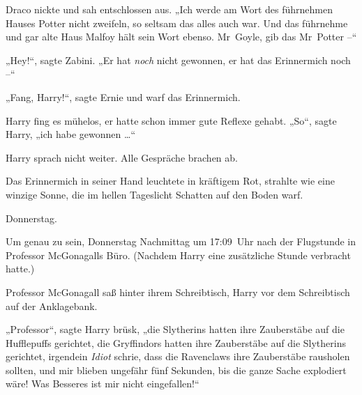 Draco nickte und sah entschlossen aus. „Ich werde am Wort des führnehmen Hauses Potter nicht zweifeln, so seltsam das alles auch war. Und das führnehme und gar alte Haus Malfoy hält sein Wort ebenso. Mr~Goyle, gib das Mr~Potter –“

„Hey!“, sagte Zabini. „Er hat \emph{noch} nicht gewonnen, er hat das Erinnermich noch –“

„Fang, Harry!“, sagte Ernie und warf das Erinnermich.

Harry fing es mühelos, er hatte schon immer gute Reflexe gehabt. „So“, sagte Harry, „ich habe gewonnen …“

Harry sprach nicht weiter. Alle Gespräche brachen ab.

Das Erinnermich in seiner Hand leuchtete in kräftigem Rot, strahlte wie eine winzige Sonne, die im hellen Tageslicht Schatten auf den Boden warf.

\later

Donnerstag.

Um genau zu sein, Donnerstag Nachmittag um 17:09~Uhr nach der Flugstunde in Professor McGonagalls Büro. (Nachdem Harry eine zusätzliche Stunde verbracht hatte.)

Professor McGonagall saß hinter ihrem Schreibtisch, Harry vor dem Schreibtisch auf der Anklagebank.

„Professor“, sagte Harry brüsk, „die Slytherins hatten ihre Zauberstäbe auf die Hufflepuffs gerichtet, die Gryffindors hatten ihre Zauberstäbe auf die Slytherins gerichtet, irgendein \emph{Idiot} schrie, dass die Ravenclaws ihre Zauberstäbe rausholen sollten, und mir blieben ungefähr fünf Sekunden, bis die ganze Sache explodiert wäre! Was Besseres ist mir nicht eingefallen!“

